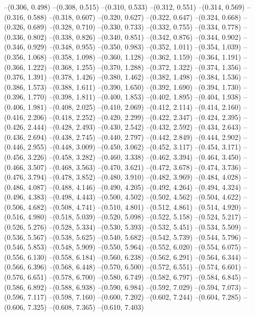 --(0.306, 0.498)
--(0.308, 0.515)
--(0.310, 0.533)
--(0.312, 0.551)
--(0.314, 0.569)
--(0.316, 0.588)
--(0.318, 0.607)
--(0.320, 0.627)
--(0.322, 0.647)
--(0.324, 0.668)
--(0.326, 0.689)
--(0.328, 0.710)
--(0.330, 0.733)
--(0.332, 0.755)
--(0.334, 0.778)
--(0.336, 0.802)
--(0.338, 0.826)
--(0.340, 0.851)
--(0.342, 0.876)
--(0.344, 0.902)
--(0.346, 0.929)
--(0.348, 0.955)
--(0.350, 0.983)
--(0.352, 1.011)
--(0.354, 1.039)
--(0.356, 1.068)
--(0.358, 1.098)
--(0.360, 1.128)
--(0.362, 1.159)
--(0.364, 1.191)
--(0.366, 1.222)
--(0.368, 1.255)
--(0.370, 1.288)
--(0.372, 1.322)
--(0.374, 1.356)
--(0.376, 1.391)
--(0.378, 1.426)
--(0.380, 1.462)
--(0.382, 1.498)
--(0.384, 1.536)
--(0.386, 1.573)
--(0.388, 1.611)
--(0.390, 1.650)
--(0.392, 1.690)
--(0.394, 1.730)
--(0.396, 1.770)
--(0.398, 1.811)
--(0.400, 1.853)
--(0.402, 1.895)
--(0.404, 1.938)
--(0.406, 1.981)
--(0.408, 2.025)
--(0.410, 2.069)
--(0.412, 2.114)
--(0.414, 2.160)
--(0.416, 2.206)
--(0.418, 2.252)
--(0.420, 2.299)
--(0.422, 2.347)
--(0.424, 2.395)
--(0.426, 2.444)
--(0.428, 2.493)
--(0.430, 2.542)
--(0.432, 2.592)
--(0.434, 2.643)
--(0.436, 2.694)
--(0.438, 2.745)
--(0.440, 2.797)
--(0.442, 2.849)
--(0.444, 2.902)
--(0.446, 2.955)
--(0.448, 3.009)
--(0.450, 3.062)
--(0.452, 3.117)
--(0.454, 3.171)
--(0.456, 3.226)
--(0.458, 3.282)
--(0.460, 3.338)
--(0.462, 3.394)
--(0.464, 3.450)
--(0.466, 3.507)
--(0.468, 3.563)
--(0.470, 3.621)
--(0.472, 3.678)
--(0.474, 3.736)
--(0.476, 3.794)
--(0.478, 3.852)
--(0.480, 3.910)
--(0.482, 3.969)
--(0.484, 4.028)
--(0.486, 4.087)
--(0.488, 4.146)
--(0.490, 4.205)
--(0.492, 4.264)
--(0.494, 4.324)
--(0.496, 4.383)
--(0.498, 4.443)
--(0.500, 4.502)
--(0.502, 4.562)
--(0.504, 4.622)
--(0.506, 4.682)
--(0.508, 4.741)
--(0.510, 4.801)
--(0.512, 4.861)
--(0.514, 4.920)
--(0.516, 4.980)
--(0.518, 5.039)
--(0.520, 5.098)
--(0.522, 5.158)
--(0.524, 5.217)
--(0.526, 5.276)
--(0.528, 5.334)
--(0.530, 5.393)
--(0.532, 5.451)
--(0.534, 5.509)
--(0.536, 5.567)
--(0.538, 5.625)
--(0.540, 5.682)
--(0.542, 5.739)
--(0.544, 5.796)
--(0.546, 5.853)
--(0.548, 5.909)
--(0.550, 5.964)
--(0.552, 6.020)
--(0.554, 6.075)
--(0.556, 6.130)
--(0.558, 6.184)
--(0.560, 6.238)
--(0.562, 6.291)
--(0.564, 6.344)
--(0.566, 6.396)
--(0.568, 6.448)
--(0.570, 6.500)
--(0.572, 6.551)
--(0.574, 6.601)
--(0.576, 6.651)
--(0.578, 6.700)
--(0.580, 6.749)
--(0.582, 6.797)
--(0.584, 6.845)
--(0.586, 6.892)
--(0.588, 6.938)
--(0.590, 6.984)
--(0.592, 7.029)
--(0.594, 7.073)
--(0.596, 7.117)
--(0.598, 7.160)
--(0.600, 7.202)
--(0.602, 7.244)
--(0.604, 7.285)
--(0.606, 7.325)
--(0.608, 7.365)
--(0.610, 7.403)
